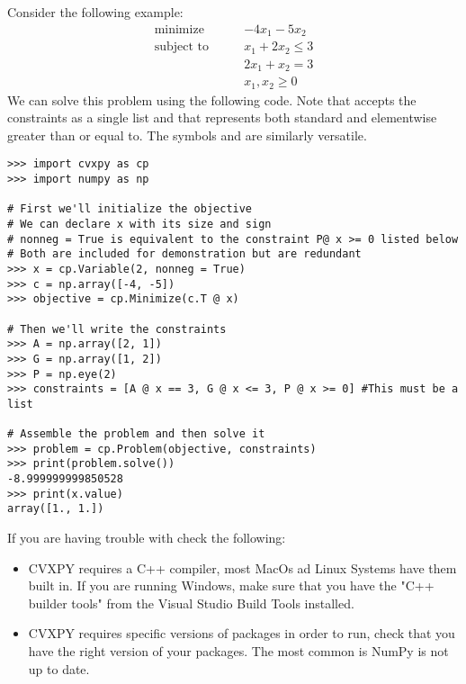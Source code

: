 Consider the following example:
\begin{align*}
\text{minimize}\qquad &-4x_1-5x_2 \\
\text{subject to}\qquad &x_1+2x_2 \leq 3 \\
	        &2x_1+x_2 = 3 \\
		&x_1, x_2 \geq 0
\end{align*}
We can solve this problem using the following code.
Note that  accepts the constraints as a single list and that \li{>=} represents both standard and elementwise greater than or equal to.
The symbols \li{<=} and \li{==} are similarly versatile.

\begin{lstlisting}
>>> import cvxpy as cp
>>> import numpy as np

# First we'll initialize the objective
# We can declare x with its size and sign
# nonneg = True is equivalent to the constraint P@ x >= 0 listed below
# Both are included for demonstration but are redundant
>>> x = cp.Variable(2, nonneg = True)	
>>> c = np.array([-4, -5])
>>> objective = cp.Minimize(c.T @ x)

# Then we'll write the constraints
>>> A = np.array([2, 1])
>>> G = np.array([1, 2])
>>> P = np.eye(2)
>>> constraints = [A @ x == 3, G @ x <= 3, P @ x >= 0] #This must be a list

# Assemble the problem and then solve it
>>> problem = cp.Problem(objective, constraints)
>>> print(problem.solve())
-8.999999999850528
>>> print(x.value)
array([1., 1.])
\end{lstlisting}

\begin{warn}
	If you are having trouble with  check the following:
	\begin{itemize}
		\item CVXPY requires a C++ compiler, most MacOs ad Linux Systems have them built in. 
		If you are running Windows, make sure that you have the "C++ builder tools" from the Visual Studio Build Tools installed.
		\item CVXPY requires specific versions of packages in order to run, check that you have the right version of your packages. 
		The most common is NumPy is not up to date.
	\end{itemize}
\end{warn}


